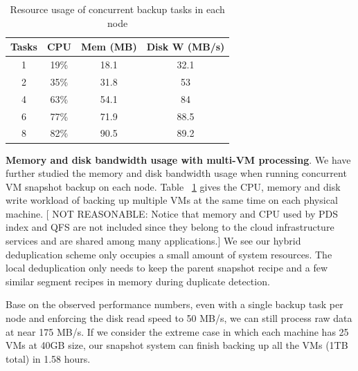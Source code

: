 \begin{table}
    \begin{tabular}{|c|c|c|c|}
    \hline
    Tasks & CPU & Mem (MB) & Disk W (MB/s) \\ \hline
    1     & 19\% & 18.1 & 32.1 \\ \hline
    2     & 35\% & 31.8 & 53 \\ \hline
    4     & 63\% & 54.1 & 84 \\ \hline
    6     & 77\% & 71.9 & 88.5 \\ \hline
    8     & 82\% & 90.5 & 89.2 \\ \hline
    \end{tabular}
\caption{Resource usage of concurrent backup tasks in each node}
\label{tab:resource_usage}
\end{table}

{\bf Memory and disk bandwidth usage with multi-VM processing}. 
We have further studied the memory and disk bandwidth usage 
when running concurrent VM snapshot backup on each node. 
Table ~\ref{tab:resource_usage} gives the CPU, memory and disk write workload of backing up multiple VMs 
at the same time on each physical machine. 
[ NOT REASONABLE: Notice that memory and CPU used by PDS index and QFS are not included since they belong to 
the cloud infrastructure services and are shared among many applications.]
We see our hybrid deduplication scheme only occupies a small amount of system resources. 
The  local deduplication only needs to keep the parent snapshot recipe and a few similar segment recipes in 
memory during duplicate detection.

Base on the observed performance numbers, even with a single backup task per node and enforcing the disk read speed to
50 MB/s,  we can still process raw data at near 175 MB/s. If we consider the extreme case in which each machine has 25 VMs
 at 40GB size, our snapshot system can finish backing up all the VMs (1TB total) in 1.58 hours.


